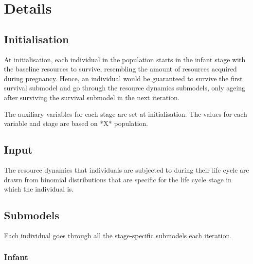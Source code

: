 \documentclass{article}
\begin{document}
\section{Details}

\subsection{Initialisation}

At initialisation, each individual in the population starts in the infant stage with the baseline resources to survive, resembling the amount of resources acquired during pregnancy. Hence, an individual would be guaranteed to survive the first survival submodel and go through the resource dynamics submodels, only ageing after surviving the survival submodel in the next iteration.

The auxiliary variables for each stage are set at initialisation. The values for each variable and stage are based on *X* population.

\subsection{Input}

The resource dynamics that individuals are subjected to during their life cycle are drawn from binomial distributions that are specific for the life cycle stage in which the individual is.

\subsection{Submodels}

Each individual goes through all the stage-specific submodels each iteration.

\subsubsection{Infant}
\end{document}
